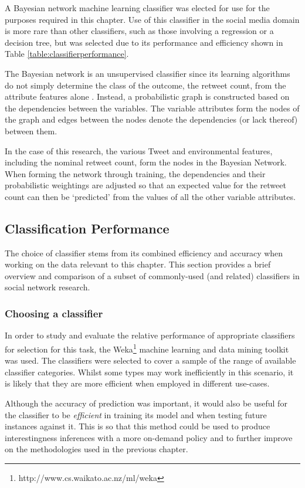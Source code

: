 A Bayesian network machine learning classifier was elected for use for the purposes required in this chapter. Use of this classifier in the social media domain is more rare than other classifiers, such as those involving a regression or a decision tree, but was selected due to its performance and efficiency shown in Table \ref{table:classifierperformance}.  

The Bayesian network is an unsupervised classifier since its learning algorithms do not simply determine the class of the outcome, the retweet count, from the attribute features alone \cite{friedman97}. Instead, a probabilistic graph is constructed based on the dependencies between the variables. The variable attributes form the nodes of the graph and edges between the nodes denote the dependencies (or lack thereof) between them.

In the case of this research, the various Tweet and environmental features, including the nominal retweet count, form the nodes in the Bayesian Network. When forming the network through training, the dependencies and their probabilistic weightings are adjusted so that an expected value for the retweet count can then be `predicted' from the values of all the other variable attributes.


\subsection{Classification Performance}
\label{section:classification_performance}
The choice of classifier stems from its combined efficiency and accuracy when working on the data relevant to this chapter. This section provides a brief overview and comparison of a subset of commonly-used (and related) classifiers in social network research.


\subsubsection{Choosing a classifier}
In order to study and evaluate the relative performance of appropriate classifiers for selection for this task, the Weka\footnote{http://www.cs.waikato.ac.nz/ml/weka} machine learning and data mining toolkit was used. The classifiers were selected to cover a sample of the range of available classifier categories. Whilst some types may work inefficiently in this scenario, it is likely that they are more efficient when employed in different use-cases.

Although the accuracy of prediction was important, it would also be useful for the classifier to be \textit{efficient} in training its model and when testing future instances against it. This is so that this method could be used to produce interestingness inferences with a more on-demand policy and to further improve on the methodologies used in the previous chapter.

